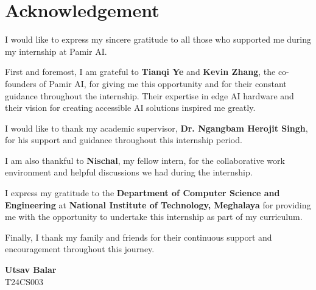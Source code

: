 \documentclass[12pt,a4paper]{report}
\begin{document}
\newpage
\chapter*{Acknowledgement}

\vspace{1cm}

I would like to express my sincere gratitude to all those who supported me during my internship at Pamir AI.

\vspace{0.5cm}

First and foremost, I am grateful to \textbf{Tianqi Ye} and \textbf{Kevin Zhang}, the co-founders of Pamir AI, for giving me this opportunity and for their constant guidance throughout the internship. Their expertise in edge AI hardware and their vision for creating accessible AI solutions inspired me greatly.

\vspace{0.5cm}

I would like to thank my academic supervisor, \textbf{Dr. Ngangbam Herojit Singh}, for his support and guidance throughout this internship period.

\vspace{0.5cm}

I am also thankful to \textbf{Nischal}, my fellow intern, for the collaborative work environment and helpful discussions we had during the internship.

\vspace{0.5cm}

I express my gratitude to the \textbf{Department of Computer Science and Engineering} at \textbf{National Institute of Technology, Meghalaya} for providing me with the opportunity to undertake this internship as part of my curriculum.

\vspace{0.5cm}

Finally, I thank my family and friends for their continuous support and encouragement throughout this journey.

\vspace{2cm}

\begin{flushright}
\textbf{Utsav Balar} \\
T24CS003
\end{flushright}
\end{document}
